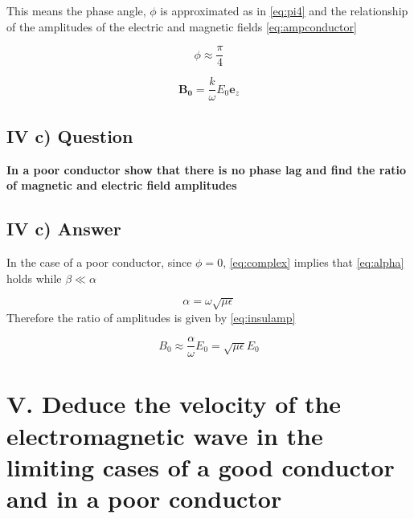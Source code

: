 \documentclass[12pt]{article}
\begin{document}
This means the phase angle, $\phi$ is approximated as in \cref{eq:pi4} and the relationship of the amplitudes of the electric and magnetic fields \cref{eq:ampconductor}

\begin{equation}
\label{eq:pi4}
\phi\approx\frac{\pi}{4}
\end{equation}

\begin{equation}
\label{eq:ampconductor}
\mathbf{B_{0}}=\frac{k}{\omega } E_{0}\mathbf{e}_{z}
\end{equation}

\subsection*{IV c) Question}

\textbf{In a poor conductor show that there is no phase lag and find the ratio of magnetic and electric field amplitudes}

\subsection*{IV c) Answer}

\noindent
In the case of a poor conductor, since $\phi=0$, \cref{eq:complex} implies that \cref{eq:alpha} holds while $\beta\ll\alpha$ 


\begin{equation}
\label{eq:alpha}
\alpha=\omega\sqrt{\mu\epsilon}
\end{equation}
\noindent
Therefore the ratio of amplitudes is given by \cref{eq:insulamp}

\begin{equation}
\label{eq:insulamp}
B_{0} \approx \frac{\alpha }{\omega}E_{0}= \sqrt{\mu\epsilon}E_{0}
\end{equation}

\section*{V. Deduce the velocity of the electromagnetic wave in the limiting cases of a good conductor and in a poor conductor}
\end{document}
